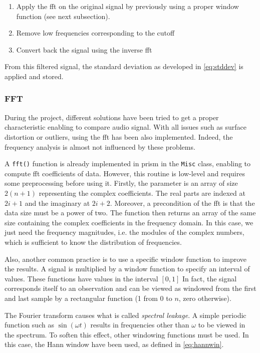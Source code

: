 \begin{enumerate}
\item Apply the \gls{fft} on the original signal by previously using a proper window function (see next subsection).
\item Remove low frequencies corresponding to the cutoff
\item Convert back the signal using the inverse \gls{fft}
\end{enumerate}

From this filtered signal, the standard deviation as developed in \eqref{eq:stddev} is applied and stored.

\subsubsection{FFT}

During the project, different solutions have been tried to get a proper characteristic enabling to compare audio signal. With all issues such as surface distortion or outliers, using the \gls{fft} has been also implemented. Indeed, the frequency analysis is almost not influenced by these problems.

A \texttt{fft()} function is already implemented in \gls{prism} in the \texttt{Misc} class, enabling to compute \gls{fft} coefficients of data. However, this routine is low-level and requires some preprocessing before using it. Firstly, the parameter is an array of size $2(n+1)$ representing the complex coefficients. The real parts are indexed at $2i+1$ and the imaginary at $2i+2$. Moreover, a precondition of the \gls{fft} is that the data size must be a power of two. The function then returns an array of the same size containing the complex coefficients in the frequency domain. In this case, we just need the frequency magnitudes, i.e. the modules of the complex numbers, which is sufficient to know the distribution of frequencies.

Also, another common practice is to use a specific window function to improve the results. A signal is multiplied by a window function to specify an interval of values. These functions have values in the interval $[0,1]$ In fact, the signal corresponds itself to an observation and can be viewed as windowed from the first and last sample by a rectangular function (1 from 0 to $n$, zero otherwise).

The Fourier transform causes what is called \emph{spectral leakage}. A simple periodic function such as $\sin(\omega t)$ results in frequencies other than $\omega$ to be viewed in the spectrum. To soften this effect, other windowing functions must be used. In this case, the Hann window have been used, as defined in \eqref{eq:hannwin}.

